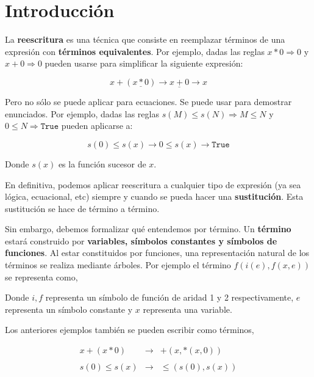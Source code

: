 \chapter*{Introducción}

La \textbf{reescritura} es una técnica que consiste en reemplazar términos de
una expresión con \textbf{términos equivalentes}. Por ejemplo, dadas las reglas
$x * 0 \Rightarrow 0$ y $x + 0 \Rightarrow 0$ pueden usarse para
simplificar la siguiente expresión:

\[
x + (\underline{x*0}) \longrightarrow \underline{x + 0} \longrightarrow x
\]

Pero no sólo se puede aplicar para ecuaciones. Se puede usar para
demostrar enunciados. Por ejemplo, dadas las reglas
$s(M) \leq s(N) \Rightarrow M \leq N$ y
$0 \leq N \Rightarrow \texttt{True}$ pueden aplicarse a:

\[
  s(0) \leq s(x) \longrightarrow 0 \leq s(x) \longrightarrow
  \texttt{True}
\]

Donde $s(x)$ es la función sucesor de $x$.

En definitiva, podemos aplicar reescritura a cualquier tipo de
expresión (ya sea lógica, ecuacional, etc) siempre y cuando se pueda
hacer una \textbf{sustitución}. Esta sustitución se hace de término a término.

Sin embargo, debemos formalizar qué entendemos por término. Un \textbf{término}
estará construido por \textbf{variables, símbolos constantes y símbolos de
funciones}. Al estar constituidos por funciones, una representación
natural de los términos se realiza mediante árboles. Por ejemplo el
término $f(i(e),f(x,e))$ se representa como,

\begin{figure}[h]
  \centering
\end{figure}

Donde $i,f$ representa un símbolo de función de aridad 1 y 2
respectivamente, $e$ representa un símbolo constante y $x$ representa
una variable.

Los anteriores ejemplos también se pueden escribir como términos,

\[
  \begin{array}{rcl}
    x +(x*0) & \longrightarrow  & +(x,*(x,0)) \\ \\
    s(0) \leq s(x) & \longrightarrow & \leq(s(0),s(x)) \\ \\

  \end{array} 
\]

